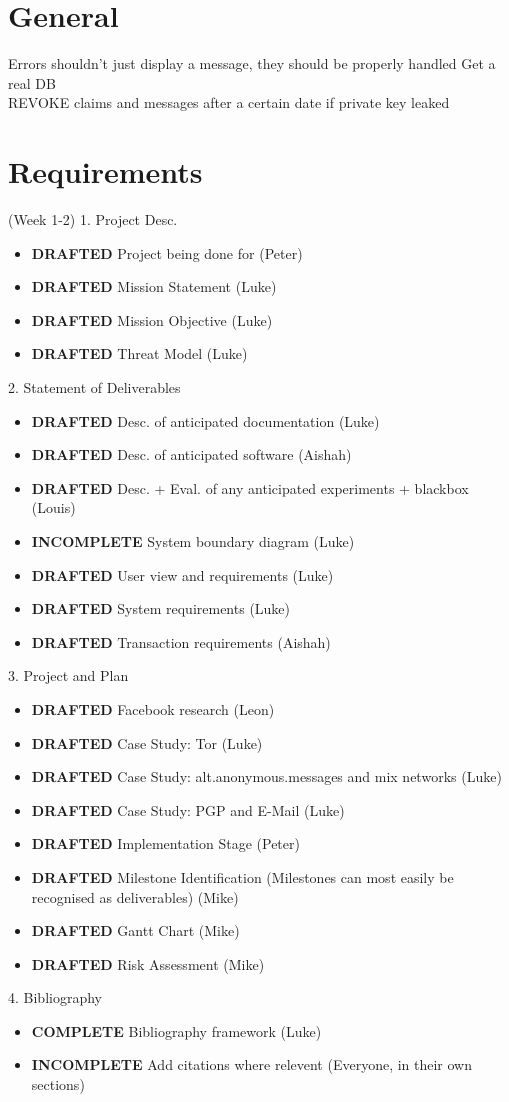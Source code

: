 \section{General}
Errors shouldn't just display a message, they should be properly handled
Get a real DB\\
REVOKE claims and messages after a certain date if private key leaked\\

\section{Requirements} (Week 1-2)
1. Project Desc.
\begin{itemize}
\item \textbf{DRAFTED} Project being done for (Peter)
\item \textbf{DRAFTED} Mission Statement (Luke)
\item \textbf{DRAFTED} Mission Objective (Luke)
\item \textbf{DRAFTED} Threat Model (Luke)
\end{itemize}

2. Statement of Deliverables
\begin{itemize}
\item \textbf{DRAFTED}    Desc. of anticipated documentation (Luke)
\item \textbf{DRAFTED}    Desc. of anticipated software (Aishah)
\item \textbf{DRAFTED}    Desc. + Eval. of any anticipated experiments + blackbox (Louis)
\item \textbf{INCOMPLETE} System boundary diagram (Luke)
\item \textbf{DRAFTED}    User view and requirements (Luke)
\item \textbf{DRAFTED}    System requirements (Luke)
\item \textbf{DRAFTED}    Transaction requirements (Aishah)
\end{itemize}

3. Project and Plan
\begin{itemize}
\item \textbf{DRAFTED}     Facebook research (Leon)
\item \textbf{DRAFTED}     Case Study: Tor (Luke)
\item \textbf{DRAFTED}     Case Study: alt.anonymous.messages and mix networks (Luke)
\item \textbf{DRAFTED}     Case Study: PGP and E-Mail (Luke)
\item \textbf{DRAFTED}     Implementation Stage (Peter)
\item \textbf{DRAFTED}     Milestone Identification (Milestones can most easily be recognised as deliverables) (Mike)
\item \textbf{DRAFTED}     Gantt Chart (Mike)
\item \textbf{DRAFTED}     Risk Assessment (Mike)
\end{itemize}

4. Bibliography
\begin{itemize}
\item \textbf{COMPLETE}   Bibliography framework (Luke)
\item \textbf{INCOMPLETE} Add citations where relevent (Everyone, in their own sections)
\end{itemize}
